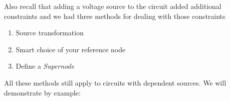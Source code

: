 \documentclass{handout}
\begin{document}
Also recall that adding a voltage source to the circuit added additional constraints and we had three methods for dealing with those constraints
\begin{enumerate}
	\item Source transformation
	\item Smart choice of your reference node
	\item Define a {\em Supernode}
\end{enumerate}

All these methods still apply to circuits with dependent sources.  We will demonstrate by example:




%
%
%
%
%
%
\end{document}
